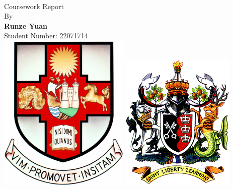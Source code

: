 \documentclass[12pt, oneside]{article}
\begin{document}
\begin{titlepage}
    \begin{center}
        \vspace*{1cm}
        {\huges
        }
         \\
         \vspace{0.3cm}
         \large{Coursework Report}
         \vspace{0.5cm}
        \\
        {\large By}
        \\
        \vspace{0.5cm}
        \textbf{Runze Yuan}
        \\
        \vspace{0.5cm}
        Student Number: 22071714
   		\vspace{1.5cm}
        \\
        \vspace{0.25cm}
       \includegraphics[scale=0.6]{logos/bristolcrest_colour.pdf}
        \hspace{5mm}
        \includegraphics[scale=0.35]{logos/UWE_insignia.png}


\end{center}
\end{titlepage}
\end{document}
